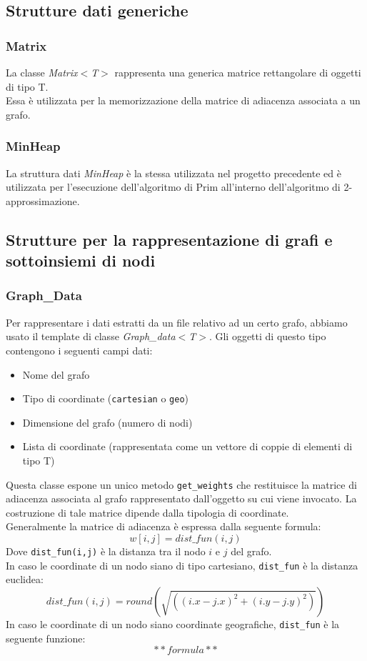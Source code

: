 \documentclass[]{article}
\begin{document}
\subsection{Strutture dati generiche}
\subsubsection{Matrix}
La classe \textit{Matrix$<$T$>$} rappresenta una generica matrice rettangolare di oggetti di tipo T.\\
Essa è utilizzata per la memorizzazione della matrice di adiacenza associata a un grafo.
\subsubsection{MinHeap}
La struttura dati \textit{MinHeap} è la stessa utilizzata nel progetto precedente ed è utilizzata per l'esecuzione dell'algoritmo di Prim all'interno dell'algoritmo di 2-approssimazione.
\subsection{Strutture per la rappresentazione di grafi e sottoinsiemi di nodi}
\subsubsection{Graph\_Data}
Per rappresentare i dati estratti da un file relativo ad un certo grafo, abbiamo usato il template di classe \textit{Graph\_data$<$T$>$}. Gli oggetti di questo tipo contengono i seguenti campi dati:
\begin{itemize}
	\item Nome del grafo
	\item Tipo di coordinate (\verb|cartesian| o \verb|geo|)
	\item Dimensione del grafo (numero di nodi)
	\item Lista di coordinate (rappresentata come un vettore di coppie di elementi di tipo T)
\end{itemize}
Questa classe espone un unico metodo \verb|get_weights| che restituisce la matrice di adiacenza associata al grafo rappresentato dall'oggetto su cui viene invocato. La costruzione di tale matrice dipende dalla tipologia di coordinate.\\
Generalmente la matrice di adiacenza è espressa dalla seguente formula:
$$w[i,j]=dist\_fun(i, j)$$
Dove \verb|dist_fun(i,j)| è la distanza tra il nodo $i$ e $j$ del grafo.\\
In caso le coordinate di un nodo siano di tipo cartesiano, \verb|dist_fun| è la distanza euclidea:
$$dist\_fun(i,j)=round(\sqrt{((i.x - j.x)^2 + (i.y - j.y)^2)})$$
In caso le coordinate di un nodo siano coordinate geografiche, \verb|dist_fun| è la seguente funzione:
$$**formula**$$
\end{document}
